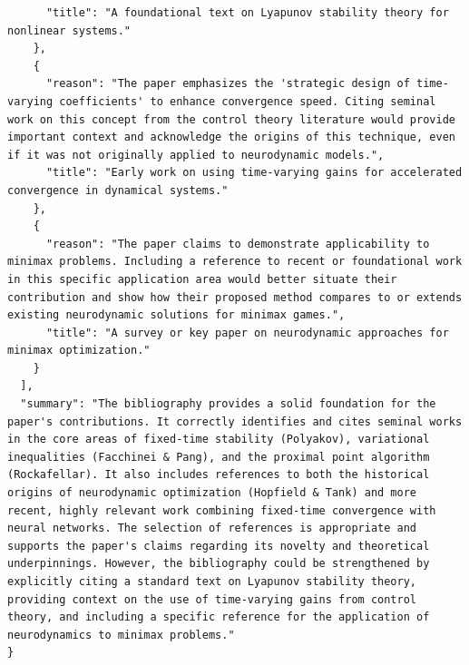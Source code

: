 \documentclass[11pt]{article}
\begin{document}
\begin{verbatim}
      "title": "A foundational text on Lyapunov stability theory for nonlinear systems."
    },
    {
      "reason": "The paper emphasizes the 'strategic design of time-varying coefficients' to enhance convergence speed. Citing seminal work on this concept from the control theory literature would provide important context and acknowledge the origins of this technique, even if it was not originally applied to neurodynamic models.",
      "title": "Early work on using time-varying gains for accelerated convergence in dynamical systems."
    },
    {
      "reason": "The paper claims to demonstrate applicability to minimax problems. Including a reference to recent or foundational work in this specific application area would better situate their contribution and show how their proposed method compares to or extends existing neurodynamic solutions for minimax games.",
      "title": "A survey or key paper on neurodynamic approaches for minimax optimization."
    }
  ],
  "summary": "The bibliography provides a solid foundation for the paper's contributions. It correctly identifies and cites seminal works in the core areas of fixed-time stability (Polyakov), variational inequalities (Facchinei & Pang), and the proximal point algorithm (Rockafellar). It also includes references to both the historical origins of neurodynamic optimization (Hopfield & Tank) and more recent, highly relevant work combining fixed-time convergence with neural networks. The selection of references is appropriate and supports the paper's claims regarding its novelty and theoretical underpinnings. However, the bibliography could be strengthened by explicitly citing a standard text on Lyapunov stability theory, providing context on the use of time-varying gains from control theory, and including a specific reference for the application of neurodynamics to minimax problems."
}
\end{verbatim}
\end{document}
